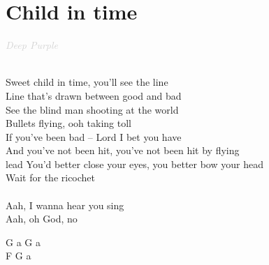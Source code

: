 \documentclass[a5paper, 10pt]{book}
\begin{document}
\newpage
\section{Child in time}\textcolor{lightgray}{\textit{Deep Purple}}\\~\\
\begin{minipage}[t]{0.8\textwidth}
Sweet child in time, you’ll see the line			\\
Line that’s drawn between good and bad			\\
See the blind man shooting at the world\\
Bullets flying, ooh taking toll\\
If you’ve been bad – Lord I bet you have\\
And you’ve not been hit, you’ve not been hit by flying \\lead
You’d better close your eyes, you better bow your head\\
Wait for the ricochet\\
\\
\hspace*{5mm}Aah, I wanna hear you sing\\
\hspace*{5mm}Aah, oh God, no\\
\end{minipage}
\begin{minipage}[t]{0.2\textwidth}
G a G a\\
F G a \\
\end{minipage}

\newpage
\end{document}
